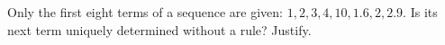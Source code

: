 Only the first eight terms of a sequence are given: $1,2,3,4,10,1.6,2,2.9$. Is its next term uniquely determined without a rule? Justify.
